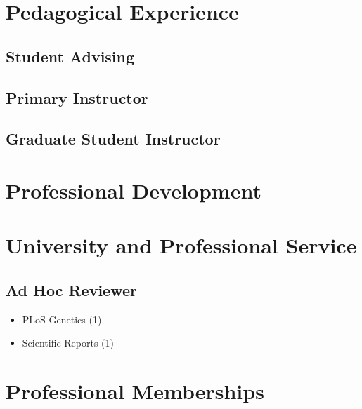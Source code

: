 \documentclass[11pt, a4paper]{awesome-cv}
\providecommand{\tightlist}{%
	\setlength{\itemsep}{0pt}\setlength{\parskip}{0pt}}
\begin{document}
\begingroup
\setlength{\parindent}{-0.5in}
\setlength{\leftskip}{0.5in}

\endgroup

\hypertarget{pedagogical-experience}{%
\section{Pedagogical Experience}\label{pedagogical-experience}}

\hypertarget{student-advising}{%
\subsection{Student Advising}\label{student-advising}}

\hypertarget{primary-instructor}{%
\subsection{Primary Instructor}\label{primary-instructor}}

\hypertarget{graduate-student-instructor}{%
\subsection{Graduate Student
Instructor}\label{graduate-student-instructor}}

\hypertarget{professional-development}{%
\section{Professional Development}\label{professional-development}}

\hypertarget{university-and-professional-service}{%
\section{University and Professional
Service}\label{university-and-professional-service}}

\hypertarget{ad-hoc-reviewer}{%
\subsection{Ad Hoc Reviewer}\label{ad-hoc-reviewer}}

\begin{itemize}
\tightlist
\item
  PLoS Genetics (1)
\item
  Scientific Reports (1)
\end{itemize}

\hypertarget{professional-memberships}{%
\section{Professional Memberships}\label{professional-memberships}}
\end{document}
